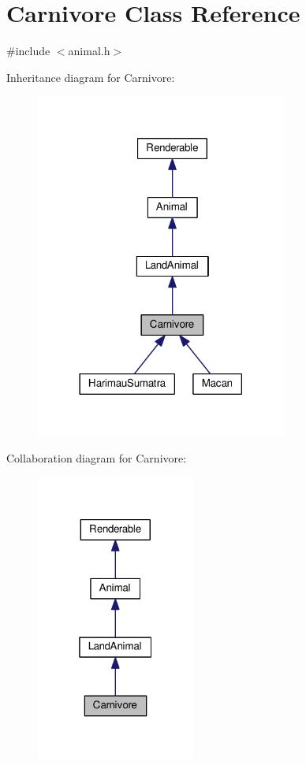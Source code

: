 \hypertarget{classCarnivore}{}\section{Carnivore Class Reference}
\label{classCarnivore}


{\ttfamily \#include $<$animal.\+h$>$}



Inheritance diagram for Carnivore\+:
\nopagebreak
\begin{figure}[H]
\begin{center}
\leavevmode
\includegraphics[width=234pt]{classCarnivore__inherit__graph}
\end{center}
\end{figure}


Collaboration diagram for Carnivore\+:
\nopagebreak
\begin{figure}[H]
\begin{center}
\leavevmode
\includegraphics[width=148pt]{classCarnivore__coll__graph}
\end{center}
\end{figure}
